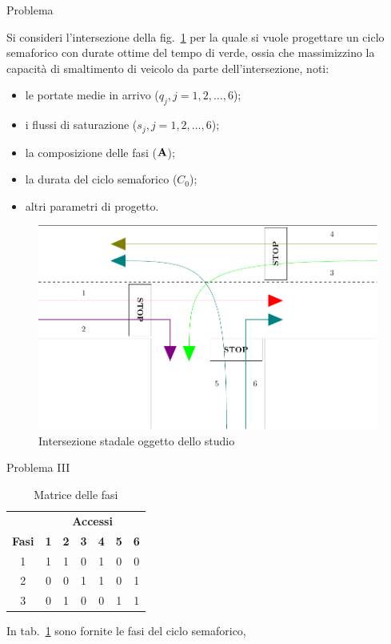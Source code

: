 \documentclass{beamer}
\begin{document}
\begin{frame}[allowframebreaks]{Problema}

Si consideri l'intersezione della fig.~\ref{fig:intersezione} per la quale si vuole progettare un
ciclo semaforico con durate ottime del tempo di verde, ossia che
massimizzino la capacit\`a di smaltimento di veicolo da parte dell'intersezione, noti:
\begin{itemize}
  \item le portate medie in arrivo ($q_j , j=1,2,\ldots,6$);
  \item i flussi di saturazione ($s_j , j=1,2,\ldots,6$);
  \item la composizione delle fasi ($\mathbf{A}$);
  \item la durata del ciclo semaforico ($C_0$);
  \item altri parametri di progetto.
\end{itemize}

\begin{figure}
\includegraphics[height=0.75\textheight]{img/incrocio_all}
\caption{Intersezione stadale oggetto dello studio}\label{fig:intersezione}
\end{figure}
\end{frame}

\begin{frame}{Problema III}
\begin{table}
 \begin{tabular}{c|cccccc}
  \toprule
  \multicolumn{1}{c}{}& \multicolumn{6}{c}{\centering\textbf{Accessi}}\\
  \textbf{Fasi} & \textbf{1} & \textbf{2} & \textbf{3} & \textbf{4} & \textbf{5} & \textbf{6}\\  
  \midrule
  1 & 1 & 1 & 0 & 1 & 0 & 0\\
  2 & 0 & 0 & 1 & 1 & 0 & 1\\
  3 & 0 & 1 & 0 & 0 & 1 & 1\\
  \bottomrule
 \end{tabular}
  \caption{Matrice delle fasi}\label{tbl:fasi}
\end{table}
In tab.~\ref{tbl:fasi} sono fornite le fasi del ciclo semaforico,
\end{frame}
\end{document}
